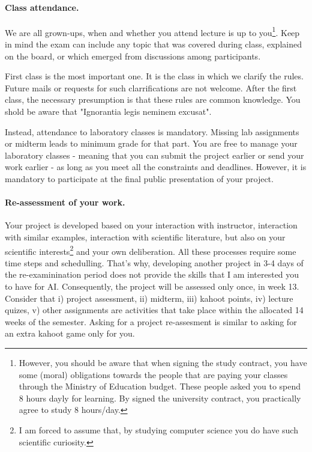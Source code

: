\paragraph{Class attendance.} 
We are all grown-ups, when and whether you attend lecture 
is up to you\footnote{However, you should be aware that when signing the study contract, you have some (moral) obligations towards the people that are paying your classes through the Ministry of Education budget. 
These people asked you to spend 8 hours dayly for learning. 
By signed the university contract, you practically agree to study 8 hours/day. }. 
Keep in mind the exam can include any topic that 
was covered during class, explained on the board, 
or which emerged from discussions among participants. 

First class is the most important one. 
It is the class in which we clarify the rules. 
Future mails or requests for such clarrifications are not welcome. 
After the first class, the necessary presumption 
is that these rules are common knowledge.
You shold be aware that "Ignorantia legis neminem excusat".


Instead, attendance to laboratory classes is mandatory.
Missing lab assignments or midterm leads to minimum grade for that part.
You are free to manage your laboratory classes - meaning that you can submit the project earlier or send your work earlier -  as long as you meet all the constraints and deadlines.
However, it is mandatory to participate at the final public presentation of your project. 

\paragraph{Re-assessment of your work.}
Your project is developed based on your interaction with instructor, 
interaction with similar examples, interaction with scientific literature, 
but also on your scientific interests\footnote{I am forced to assume that, 
by studying computer science you do have such scientific curiosity.} 
and your own deliberation.
All these processes require some time steps and schedulling.
That's why, developing another project in 3-4 days of the re-examinination 
period does not provide the skills that I am interested you to have for AI.
Consequently, the project will be assessed only once, in week 13. 
Consider that 
i) project assessment,
ii) midterm,
iii) kahoot points,
iv) lecture quizes,
v) other assignments
are activities that take place within the allocated 14 weeks of the semester.
Asking for a project re-assesment is similar to asking for an extra kahoot game only for you.





